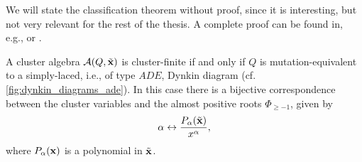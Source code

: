 We will state the classification theorem without proof, since it is interesting, but
not very relevant for the rest of the thesis. A complete proof can be found in, e.g.,
\cite{FominZelevinsky2003CAFin} or \cite{FominWilliams2021IntroductionCA_4-5}.
\begin{theorem}\label{thm:cluster_finite_classification}

	A cluster algebra $\mathcal{A} (Q, \tilde{\mathbf{x}})$ is cluster-finite if and only if $Q$ is
	mutation-equivalent to a simply-laced, i.e., of type $ADE$, Dynkin diagram (cf. \cref{fig:dynkin_diagrams_ade}). In this case there is a bijective
	correspondence between the cluster variables and the almost positive roots $\Phi_{\geq
			-1}$, given by
	\begin{equation*}
		\alpha \leftrightarrow \frac{P_\alpha (\tilde{\mathbf{x}})}{x^\alpha},
	\end{equation*}
	where $P_\alpha (\mathbf{x})$ is a polynomial in $\tilde{\mathbf{x}}$.
\end{theorem}

